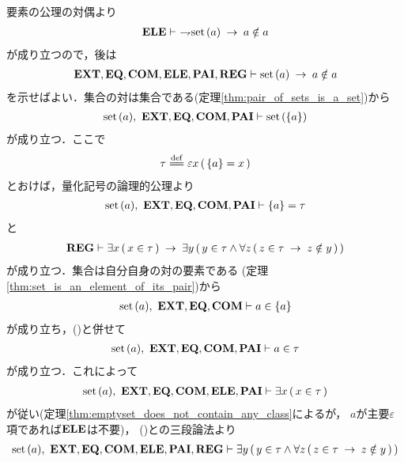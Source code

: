 	\begin{sketch}
		要素の公理の対偶より
		\begin{align}
			\mbox{{\bf ELE}} \vdash\ \rightharpoondown\hspace{-0.25em} \operatorname*{set}\hspace{0.15em}(a) \hspace{0.25em}\rightarrow\hspace{0.25em} a \notin a
		\end{align}
		が成り立つので，後は
		\begin{align}
			\mbox{{\bf EXT}},\mbox{{\bf EQ}},\mbox{\bf COM},\mbox{{\bf ELE}},\mbox{{\bf PAI}},\mbox{{\bf REG}} 
			\vdash \operatorname*{set}\hspace{0.15em}(a) \hspace{0.25em}\rightarrow\hspace{0.25em} a \notin a
		\end{align}
		を示せばよい．集合の対は集合である(定理\ref{thm:pair_of_sets_is_a_set})から
		\begin{align}
			\operatorname*{set}\hspace{0.15em}(a),\ \mbox{{\bf EXT}},\mbox{{\bf EQ}},\mbox{\bf COM},\mbox{{\bf PAI}} \vdash \operatorname*{set}\hspace{0.15em}(\{a\})
		\end{align}
		が成り立つ．ここで
		\begin{align}
			\tau \defeq \varepsilon x\, (\, \{a\} = x\, )
		\end{align}
		とおけば，量化記号の論理的公理より
		\begin{align}
			\set{a},\ \EXTAX,\EQAX,\COMAX,\PAIAX \vdash \{a\} = \tau
			\label{fom:no_class_contains_itself_1}
		\end{align}
		と
		\begin{align}
			\REGAX \vdash \exists x\, (\, x \in \tau\, )
			\rarrow \exists y\, (\, y \in \tau \wedge \forall z\, (\, 
			z \in \tau \rarrow z \notin y\, )\, )
			\label{fom:no_class_contains_itself_2}
		\end{align}
		が成り立つ．集合は自分自身の対の要素である
		(定理\ref{thm:set_is_an_element_of_its_pair})から
		\begin{align}
			\set{a},\ \EXTAX,\EQAX,\COMAX \vdash a \in \{a\}
			\label{fom:no_class_contains_itself_3}
		\end{align}
		が成り立ち，()と併せて
		\begin{align}
			\operatorname*{set}\hspace{0.15em}(a),\ \mbox{{\bf EXT}},\mbox{{\bf EQ}},\mbox{\bf COM},\mbox{{\bf PAI}} \vdash a \in \tau
		\end{align}
		が成り立つ．これによって
		\begin{align}
			\operatorname*{set}\hspace{0.15em}(a),\ \mbox{{\bf EXT}},\mbox{{\bf EQ}},\mbox{\bf COM},\mbox{{\bf ELE}},\mbox{{\bf PAI}} \vdash 
			\exists x\, (\, x \in \tau\, )
		\end{align}
		が従い(定理\ref{thm:emptyset_does_not_contain_any_class}によるが，
		$a$が主要$\varepsilon$項であれば$\mbox{{\bf ELE}}$は不要)，
		()との三段論法より
		\begin{align}
			\operatorname*{set}\hspace{0.15em}(a),\ \mbox{{\bf EXT}},\mbox{{\bf EQ}},\mbox{\bf COM},\mbox{{\bf ELE}},\mbox{{\bf PAI}},\mbox{{\bf REG}} \vdash
			\exists y\, (\, y \in \tau \wedge \forall z\, (\, 
			z \in \tau \hspace{0.25em}\rightarrow\hspace{0.25em} z \notin y\, )\, )
		\end{align}

\end{sketch}
